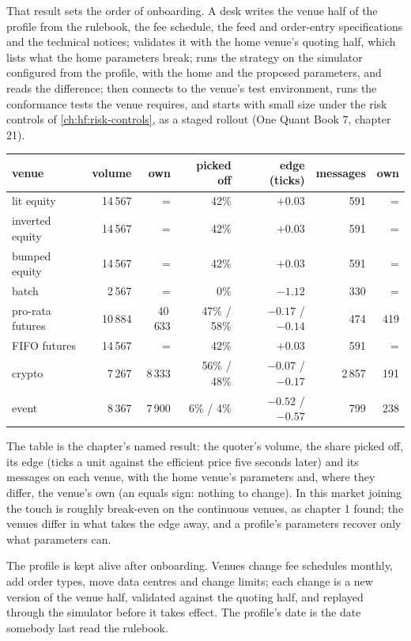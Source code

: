 That result sets the order of onboarding. A desk writes the venue half of the profile from the rulebook, the fee schedule, the feed and
order-entry specifications and the technical notices; validates it with the home venue's quoting half, which lists what the home parameters break;
runs the strategy on the simulator configured from the profile, with the home and the proposed parameters, and reads the difference; then connects
to the venue's test environment, runs the conformance tests the venue requires, and starts with small size under the risk controls of
\cref{ch:hf:risk-controls}, as a staged rollout (One Quant Book 7, chapter 21).

\begin{center}
\small
\begin{tabular}{@{}lrrrrrr@{}}
\toprule
venue & volume & own & picked off & edge (ticks) & messages & own\\
\midrule
lit equity & 14\,567 & = & 42\% & $+0.03$ & 591 & =\\
inverted equity & 14\,567 & = & 42\% & $+0.03$ & 591 & =\\
bumped equity & 14\,567 & = & 42\% & $+0.03$ & 591 & =\\
batch & 2\,567 & = & 0\% & $-1.12$ & 330 & =\\
pro-rata futures & 10\,884 & 40\,633 & 47\% / 58\% & $-0.17$ / $-0.14$ & 474 & 419\\
FIFO futures & 14\,567 & = & 42\% & $+0.03$ & 591 & =\\
crypto & 7\,267 & 8\,333 & 56\% / 48\% & $-0.07$ / $-0.17$ & 2\,857 & 191\\
event & 8\,367 & 7\,900 & 6\% / 4\% & $-0.52$ / $-0.57$ & 799 & 238\\
\bottomrule
\end{tabular}
\end{center}

The table is the chapter's named result: the quoter's volume, the share picked off, its edge (ticks a unit against the efficient price five seconds
later) and its messages on each venue, with the home venue's parameters and, where they differ, the venue's own (an equals sign: nothing to
change). In this market joining the touch is roughly break-even on the continuous venues, as chapter 1 found; the venues differ in what takes the
edge away, and a profile's parameters recover only what parameters can.

The profile is kept alive after onboarding. Venues change fee schedules monthly, add order types, move data centres and change limits; each change is
a new version of the venue half, validated against the quoting half, and replayed through the simulator before it takes effect. The profile's date
is the date somebody last read the rulebook.

